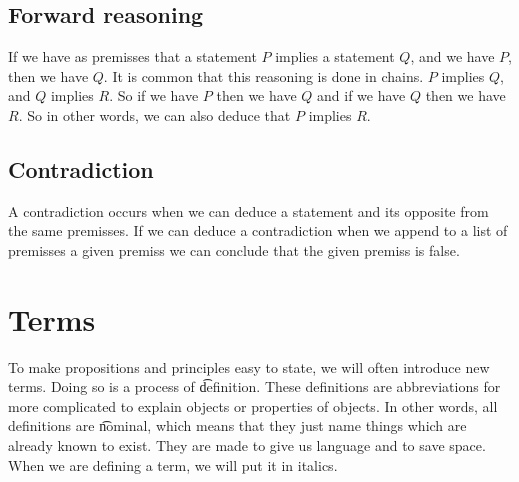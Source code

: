 \subsection*{Forward reasoning}

If we have as premisses that a statement $P$ implies a statement $Q$, and we have $P$, then we have $Q$.
It is common that this reasoning is done in chains.
$P$ implies $Q$, and $Q$ implies $R$. So if we have $P$ then we have $Q$ and if we have $Q$ then we have $R$.
So in other words, we can also deduce that $P$ implies $R$.

\subsection*{Contradiction}

A contradiction occurs when we can deduce a statement and its opposite from the same premisses.
If we can deduce a contradiction when we append to a list of premisses a given premiss we can conclude that the given premiss is false.

\section*{Terms}

To make propositions and principles easy to state, we will often introduce new terms.
Doing so is a process of \t{definition}.
These definitions are abbreviations for more complicated to explain objects or properties of objects.
In other words, all definitions are \t{nominal}, which means that they just name things which are already known to exist.
They are made to give us language and to save space.
When we are defining a term, we will put it in italics.

